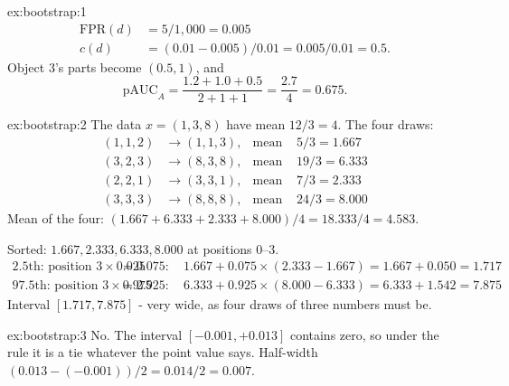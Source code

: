 
\begin{solution}{ex:bootstrap:1}
\begin{align*}
\mathrm{FPR}(d) &= 5 / 1{,}000 = 0.005\\
c(d) &= (0.01 - 0.005)/0.01 = 0.005/0.01 = 0.5.
\end{align*}
Object 3's parts become $(0.5, 1)$, and
\[
\mathrm{pAUC}_A = \frac{1.2 + 1.0 + 0.5}{2 + 1 + 1} = \frac{2.7}{4} = 0.675.
\]
\end{solution}

\begin{solution}{ex:bootstrap:2}
The data $x = (1, 3, 8)$ have mean $12/3 = 4$. The four draws:
\begin{align*}
(1,1,2) &\to (1, 1, 3), & \text{mean } &5/3 = 1.667\\
(3,2,3) &\to (8, 3, 8), & \text{mean } &19/3 = 6.333\\
(2,2,1) &\to (3, 3, 1), & \text{mean } &7/3 = 2.333\\
(3,3,3) &\to (8, 8, 8), & \text{mean } &24/3 = 8.000
\end{align*}
Mean of the four: $(1.667 + 6.333 + 2.333 + 8.000)/4 = 18.333/4 = 4.583$.

Sorted: $1.667, 2.333, 6.333, 8.000$ at positions 0--3.
\begin{align*}
\text{2.5th: position } 3 \times 0.025 &= 0.075: \quad 1.667 + 0.075 \times (2.333 - 1.667) = 1.667 + 0.050 = 1.717\\
\text{97.5th: position } 3 \times 0.975 &= 2.925: \quad 6.333 + 0.925 \times (8.000 - 6.333) = 6.333 + 1.542 = 7.875
\end{align*}
Interval $[1.717, 7.875]$ - very wide, as four draws of three numbers must be.
\end{solution}

\begin{solution}{ex:bootstrap:3}
No. The interval $[-0.001, +0.013]$ contains zero, so under the rule it is a tie whatever the point value says.
Half-width $(0.013 - (-0.001))/2 = 0.014/2 = 0.007$.
\end{solution}

